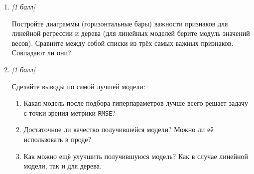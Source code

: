 \begin{enumerate}[label=\textbf{Task \arabic*:}, leftmargin=*]
Для подбора параметров используйте \texttt{GridSearchCV} с \(5\) фолдами и метрикой \texttt{r2}.

\textbf{Важно!} Подбор параметров осуществляется только по тренировочным данным! Контролируйте свои пайплайны обучения на предмет ликов!

После подбора гиперпараметров обучите модели с найденными гиперпараметрами на тренировочных данных, сделайте предсказания на тесте и оцените их качество (\texttt{RMSE}).

Какая модель справилась с решением задачи лучше всего по метрике \texttt{RMSE}?

\textit{Подсказка:} оформите полученные метрики в \texttt{pd.DataFrame}.

\item \textit{[1 балл]}

Постройте диаграммы (горизонтальные бары) важности признаков для линейной регрессии и дерева (для линейных моделей берите модуль значений весов). Сравните между собой списки из трёх самых важных признаков. Совпадают ли они?

\item \textit{[1 балл]}

Сделайте выводы по самой лучшей модели:
\begin{enumerate}[label=\arabic*)]
    \item Какая модель после подбора гиперпараметров лучше всего решает задачу с точки зрения метрики \texttt{RMSE}?
    \item Достаточное ли качество получившейся модели? Можно ли её использовать в проде?
    \item Как можно ещё улучшить получившуюся модель? Как в случае линейной модели, так и для дерева.
\end{enumerate}

\end{enumerate}